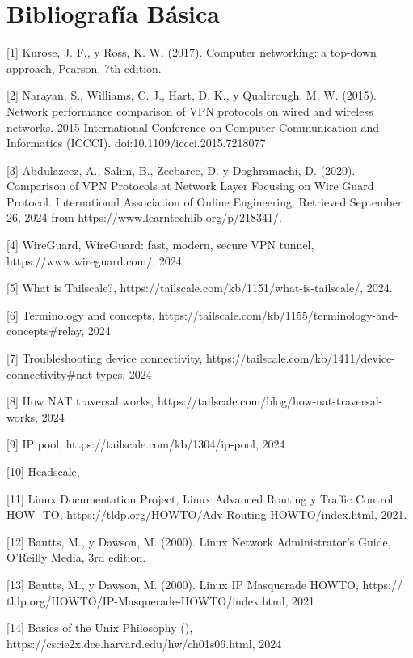 \documentclass[letterpaper,12pt,oneside]{book}
\begin{document}
\section{Bibliografía Básica}
[1] Kurose, J. F., y Ross, K. W. (2017). Computer networking: a top-down approach,
Pearson, 7th edition.

[2] Narayan, S., Williams, C. J., Hart, D. K., y Qualtrough, M. W. (2015). Network performance comparison of VPN protocols on wired and wireless networks. 2015 International Conference on Computer Communication and Informatics (ICCCI). doi:10.1109/iccci.2015.7218077

[3]  Abdulazeez, A., Salim, B., Zeebaree, D. y Doghramachi, D. (2020). Comparison of VPN Protocols at Network Layer Focusing on Wire Guard Protocol. International Association of Online Engineering. Retrieved September 26, 2024 from https://www.learntechlib.org/p/218341/. 

[4] WireGuard, WireGuard: fast, modern, secure VPN tunnel, https://www.wireguard.com/, 2024.

[5] What is Tailscale?, https://tailscale.com/kb/1151/what-is-tailscale/, 2024.

[6] Terminology and concepts, https://tailscale.com/kb/1155/terminology-and-concepts\#relay, 2024

[7] Troubleshooting device connectivity, https://tailscale.com/kb/1411/device-connectivity\#nat-types, 2024

[8] How NAT traversal works, https://tailscale.com/blog/how-nat-traversal-works, 2024

[9] IP pool, https://tailscale.com/kb/1304/ip-pool, 2024

[10] Headscale, 

[11] Linux Documentation Project, Linux Advanced Routing y Traffic Control HOW-
TO, https://tldp.org/HOWTO/Adv-Routing-HOWTO/index.html, 2021.  

[12] Bautts, M., y Dawson, M. (2000). Linux Network Administrator’s Guide, O’Reilly
Media, 3rd edition.

[13] Bautts, M., y Dawson, M. (2000). Linux IP Masquerade HOWTO, https://
tldp.org/HOWTO/IP-Masquerade-HOWTO/index.html, 2021

[14] Basics of the Unix Philosophy (), https://cscie2x.dce.harvard.edu/hw/ch01s06.html, 2024
\end{document}
